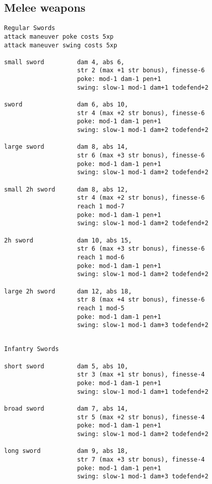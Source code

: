 \subsection*{Melee weapons}
\small
\begin{verbatim}
Regular Swords
attack maneuver poke costs 5xp
attack maneuver swing costs 5xp

small sword         dam 4, abs 6,
                    str 2 (max +1 str bonus), finesse-6
                    poke: mod-1 dam-1 pen+1
                    swing: slow-1 mod-1 dam+1 todefend+2

sword               dam 6, abs 10,
                    str 4 (max +2 str bonus), finesse-6
                    poke: mod-1 dam-1 pen+1
                    swing: slow-1 mod-1 dam+2 todefend+2

large sword         dam 8, abs 14,
                    str 6 (max +3 str bonus), finesse-6
                    poke: mod-1 dam-1 pen+1
                    swing: slow-1 mod-1 dam+2 todefend+2

small 2h sword      dam 8, abs 12,
                    str 4 (max +2 str bonus), finesse-6
                    reach 1 mod-7
                    poke: mod-1 dam-1 pen+1
                    swing: slow-1 mod-1 dam+2 todefend+2

2h sword            dam 10, abs 15,
                    str 6 (max +3 str bonus), finesse-6
                    reach 1 mod-6
                    poke: mod-1 dam-1 pen+1
                    swing: slow-1 mod-1 dam+2 todefend+2

large 2h sword      dam 12, abs 18,
                    str 8 (max +4 str bonus), finesse-6
                    reach 1 mod-5
                    poke: mod-1 dam-1 pen+1
                    swing: slow-1 mod-1 dam+3 todefend+2


\end{verbatim} \pagebreak[1] \begin{verbatim}
Infantry Swords

short sword         dam 5, abs 10,
                    str 3 (max +1 str bonus), finesse-4
                    poke: mod-1 dam-1 pen+1
                    swing: slow-1 mod-1 dam+1 todefend+2

broad sword         dam 7, abs 14,
                    str 5 (max +2 str bonus), finesse-4
                    poke: mod-1 dam-1 pen+1
                    swing: slow-1 mod-1 dam+2 todefend+2

long sword          dam 9, abs 18,
                    str 7 (max +3 str bonus), finesse-4
                    poke: mod-1 dam-1 pen+1
                    swing: slow-1 mod-1 dam+3 todefend+2



\end{verbatim}
